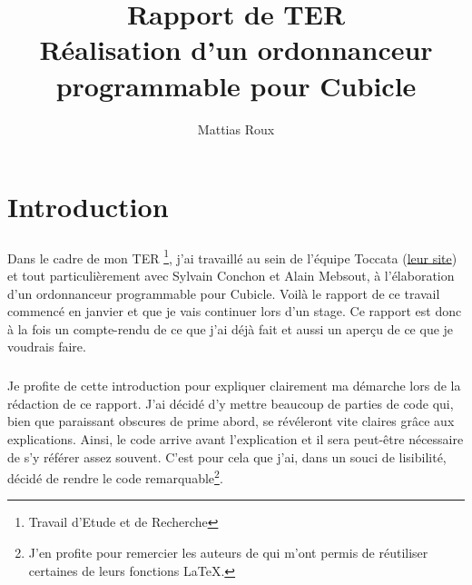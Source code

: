 \documentclass{memoir}
\title{\vspace{-1.0cm}Rapport de TER \\ Réalisation d'un  ordonnanceur programmable pour Cubicle}
\author{Mattias Roux}
\begin{document}
\maketitle

\tableofcontents


\chapter{Introduction}
\label{chap:intro}

	
	\paragraph{}Dans le cadre de mon TER \footnote{Travail d'Etude et de Recherche}, j'ai travaillé au sein de l'équipe Toccata (\href{http://toccata.lri.fr/index.fr.html}{leur site}) et tout particulièrement avec Sylvain Conchon et Alain Mebsout, à l'élaboration d'un ordonnanceur programmable pour Cubicle.
	Voilà le rapport de ce travail commencé en janvier et que je vais continuer lors d'un stage. Ce rapport est donc à la fois un compte-rendu de ce que j'ai déjà fait et aussi un aperçu de ce que je voudrais faire.
	\paragraph{}Je profite de cette introduction pour expliquer clairement ma démarche lors de la rédaction de ce rapport. J'ai décidé d'y mettre beaucoup de parties de code qui, bien que paraissant obscures de prime abord, se révéleront vite claires grâce aux explications. Ainsi, le code arrive avant l'explication et il sera peut-être nécessaire de s'y référer assez souvent. C'est pour cela que j'ai, dans un souci de lisibilité, décidé de rendre le code remarquable\footnote{J'en profite pour remercier les auteurs de \cite{Verif} qui m'ont permis de réutiliser certaines de leurs fonctions \LaTeX.}. 
\end{document}
